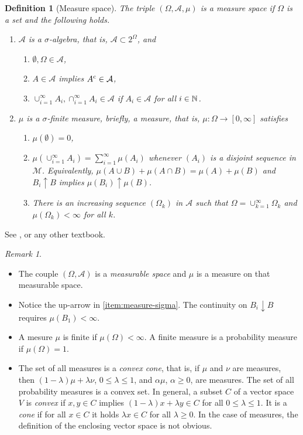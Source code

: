 \documentclass[12pt,a4paper]{amsart}
\theoremstyle{plain}
\newtheorem{definition}[theorem]{Definition}%
\theoremstyle{definition}
\theoremstyle{remark}
\newtheorem{remark}[theorem]{Remark}
\begin{document}
\begin{definition}[Measure space]
The triple $(\Omega,\mathcal A,\mu)$ is a \emph{measure space} if
$\Omega$ is a set and the following holds.
\begin{enumerate}
\item $\mathcal A$ is a \emph{$\sigma$-algebra}, that is, $\mathcal A
  \subset 2^\Omega$, and
  \begin{enumerate}
  \item $\emptyset, \Omega \in \mathcal A$,
  \item $A \in \mathcal A$ implies $A^{\text c} \in \mathcal A$,
  \item
    $\cup_{i=1}^{\infty} A_i, \cap_{i=1}^{\infty} A_i \in \mathcal A$
    if $A_i \in \mathcal A$ for all $i \in \mathbb{N}$.
  \end{enumerate}
  \item $\mu$ is a \emph{$\sigma$-finite measure}, briefly, a
    \emph{measure}, that is, $\mu \colon \Omega \to [0,\infty]$ satisfies
  \begin{enumerate} 
  \item $\mu(\emptyset) = 0$,
  \item \label{item:measure-sigma}
    $\mu\left(\cup_{i=1 }^\infty A_i\right) = \sum_{i=1}^\infty
    \mu(A_i)$ whenever $(A_i)$ is a disjoint sequence in $\mathcal
    M$. Equivalently,
    $\mu(A \cup B) + \mu(A \cap B) = \mu(A) + \mu(B)$ and
    $B_i \uparrow B$ implies $\mu(B_i) \uparrow \mu(B)$.
  \item There is an increasing sequence $(\Omega_k)$ in $\mathcal A$
    such that $\Omega = \cup_{k=1}^\infty \Omega_k$ and
    $\mu(\Omega_k) < \infty$ for all $k$.
  \end{enumerate}
\end{enumerate}
\end{definition}
See \cite[Cap. 1]{rudin:1987-3rd}, or any other textbook.
\begin{remark}\ 
\begin{itemize}
\item The couple $(\Omega,\mathcal A)$ is a \emph{measurable space} and
$\mu$ is a measure on that measurable space. 
\item  Notice the up-arrow in
\cref{item:measure-sigma}. The continuity on $B_i \downarrow B$
requires $\mu(B_1) < \infty$. 
\item  A mesure $\mu$ is finite if
$\mu(\Omega) < \infty$. A finite measure is a probability measure if
$\mu(\Omega) =1$.
\item The set of all measures is a \emph{convex cone}, that is, if
  $\mu$ and $\nu$ are measures, then $(1-\lambda)\mu+\lambda \nu$,
  $0 \leq \lambda \leq 1$, and $\alpha \mu$, $\alpha \geq 0$, are
  measures. The set of all probability measures is a convex set. In
  general, a subset $C$ of a vector space $V$ is \emph{convex} if
  $x,y \in C$ implies $(1-\lambda)x + \lambda y \in C$ for all
  $0 \leq \lambda \leq 1$. It is a \emph{cone} if for all $x \in C$ it
  holds $\lambda x \in C$ for all $\lambda \geq 0$. In the case of
  measures, the definition of the enclosing vector space is not
  obvious.
\end{itemize}
\end{remark}
\end{document}
